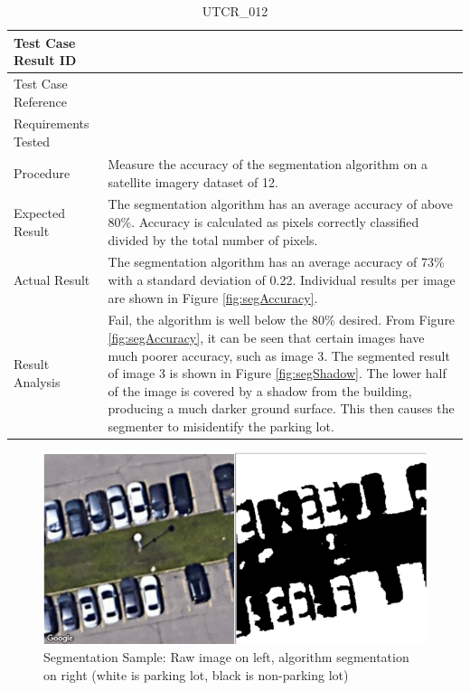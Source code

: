 \documentclass[12pt, titlepage]{article}
\begin{document}
\begin{table}[!h]
\begin{center}
\caption {UTCR\_012}
\label{tab:UTCR_012}
\begin{tabular}{ | m{3.2cm} | m{12.2cm} | } 
\hline
Test Case Result ID & \nameref{tab:UTCR_012} \\ 
\hline
Test Case Reference & \nameref{tab:UTC_012}  \\ 
\hline
Requirements Tested & \nameref{GEN_001} \\ 
\hline
Procedure & Measure the accuracy of the segmentation algorithm on a satellite imagery dataset of 12. \\ 
\hline
Expected Result & The segmentation algorithm has an average accuracy of above 80\%. Accuracy is calculated as pixels correctly classified divided by the total number of pixels. \\ 
\hline
Actual Result & The segmentation algorithm has an average accuracy of 73\% with a standard deviation of 0.22. Individual results per image are shown in Figure \ref{fig:segAccuracy}. \\ 
\hline
Result Analysis & Fail, the algorithm is well below the 80\% desired. From Figure \ref{fig:segAccuracy}, it can be seen that certain images have much poorer accuracy, such as image 3. The segmented result of image 3 is shown in Figure \ref{fig:segShadow}. The lower half of the image is covered by a shadow from the building, producing a much darker ground surface. This then causes the segmenter to misidentify the parking lot.  \\ 
\hline
\end{tabular}
\end{center}
\end{table}

\begin{figure}[h!]
  \begin{center} 
  \caption{Segmentation Sample: Raw image on left, algorithm segmentation on right (white is parking lot, black is non-parking lot) }
  \label{fig:segResult}
        \includegraphics[width=1\textwidth]{VnVReport/SegmentationResult.png}
  \end{center}
\end{figure}
\end{document}

